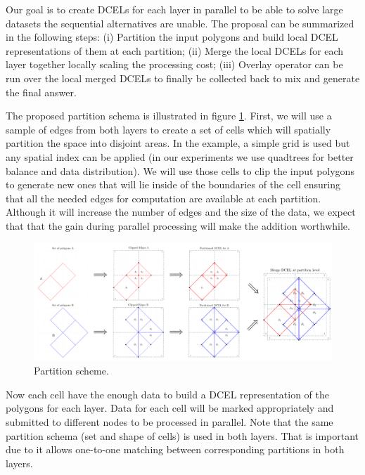 Our goal is to create DCELs for each layer in parallel to be able to solve large datasets the sequential alternatives are unable.  The proposal can be summarized in the following steps: (i) Partition the input polygons and build local DCEL representations of them at each partition; (ii) Merge the local DCELs for each layer together locally scaling the processing cost; (iii) Overlay operator can be run over the local merged DCELs to finally be collected back to mix and generate the final answer.  

The proposed partition schema is illustrated in figure \ref{fig:overlay_parted}.  First, we will use a sample of edges from both layers to create a set of cells which will spatially partition the space into disjoint areas.  In the example, a simple grid is used but any spatial index can be applied (in our experiments we use quadtrees for better balance and data distribution).  We will use those cells to clip the input polygons to generate new ones that will lie inside of the boundaries of the cell ensuring that all the needed edges for computation are available at each partition.  Although it will increase the number of edges and the size of the data, we expect that that the gain during parallel processing will make the addition worthwhile.

\begin{figure}[!ht]
    \centering
    \includegraphics[width=\textwidth]{figures/01-OverlayParted}
    \caption{Partition scheme.}\label{fig:overlay_parted}
\end{figure}

Now each cell have the enough data to build a DCEL representation of the polygons for each layer.  Data for each cell will be marked appropriately and submitted to different nodes to be processed in parallel.  Note that the same partition schema (set and shape of cells) is used in both layers.  That is important due to it allows one-to-one matching between corresponding partitions in both layers.

